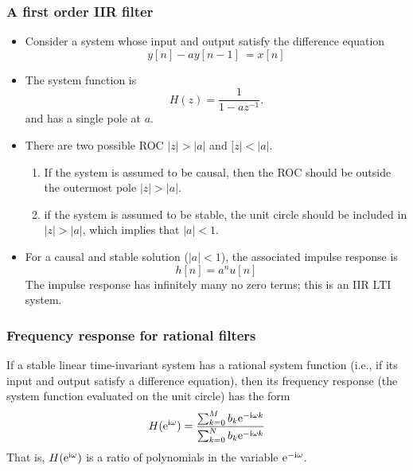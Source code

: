 \begin{frame}
\frametitle{A first order IIR filter}
\begin{itemize}
\item Consider a  system whose input and output satisfy the difference equation
$$
y[n]-ay[n-1]\ =x[n]
$$
\item The system function is
$$
H(z)=\frac{1}{1-az^{-1}}.
$$
and has a \alert{single pole} at $a$.
\item There are two possible ROC $|z| > |a|$ and $[z| < |a|$. 
\begin{enumerate}
\item If the system is assumed to be \alert{causal}, then the ROC should be outside the outermost pole  $|z|>|a|$.
\item if the system is assumed to be \alert{stable}, the unit circle should be included in $|z| > |a|$, which implies that $|a|<1$. 
\end{enumerate}
\item For a \alert{causal} and \alert{stable} solution ($|a| < 1$), the associated impulse response is
$$
h[n]=a^{n}u[n]  
$$
The impulse response has infinitely many no zero terms; this is an IIR LTI system. 
\end{itemize}
\end{frame}

\begin{frame}
\frametitle{Frequency response for rational filters}
If a stable linear time-invariant system has a rational system function (i.e., if its input and output satisfy a difference equation), then its frequency response (the system function evaluated on the unit circle) has the form
$$
H(\mathrm{e}^{\mathrm{i}\omega})=\frac{\sum_{k=0}^M b_k \mathrm{e}^{-\mathrm{i} \omega k}}{\sum_{k=0}^N b_k \mathrm{e}^{-\mathrm{i} \omega k}} 
$$
That is, $H(\mathrm{e}^{\mathrm{i}\omega})$ is a ratio of polynomials in the variable $\mathrm{e}^{-\mathrm{i}\omega}$.
\end{frame}



 